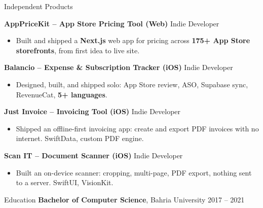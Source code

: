 \documentclass{resume}
\begin{document}
\begin{rSection}{Independent Products}

\textbf{AppPriceKit -- App Store Pricing Tool (Web)} \hfill Indie Developer
\nopagebreak
\begin{itemize}
\itemsep 1pt {}
\item Built and shipped a \textbf{Next.js} web app for pricing across \textbf{175+ App Store storefronts}, from first idea to live site.
\end{itemize}

\textbf{Balancio -- Expense \& Subscription Tracker (iOS)} \hfill Indie Developer
\nopagebreak
\begin{itemize}
\itemsep 1pt {}
\item Designed, built, and shipped solo: App Store review, ASO, Supabase sync, RevenueCat, \textbf{5+ languages}.
\end{itemize}

\textbf{Just Invoice -- Invoicing Tool (iOS)} \hfill Indie Developer
\nopagebreak
\begin{itemize}
\itemsep 1pt {}
\item Shipped an offline-first invoicing app: create and export PDF invoices with no internet. SwiftData, custom PDF engine.
\end{itemize}

\textbf{Scan IT -- Document Scanner (iOS)} \hfill Indie Developer
\nopagebreak
\begin{itemize}
\itemsep 1pt {}
\item Built an on-device scanner: cropping, multi-page, PDF export, nothing sent to a server. SwiftUI, VisionKit.
\end{itemize}

\end{rSection}

\begin{rSection}{Education}
{\bf Bachelor of Computer Science}, Bahria University \hfill {2017 -- 2021}
\end{rSection}
\end{document}
